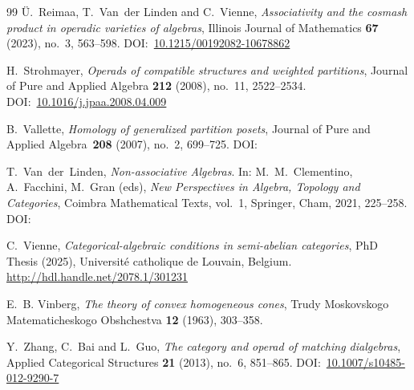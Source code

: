 \documentclass[reqno,a4paper]{amsart}
\renewcommand{\doi}[1]{DOI:~\href{https://doi.org/#1}{#1}}
\theoremstyle{plain}
\theoremstyle{definition}
\theoremstyle{remark}
\numberwithin{equation}{section}
\begin{document}
\begin{thebibliography}{99}
Ü.~Reimaa, T.~Van~der Linden and C.~Vienne, \emph{Associativity and the cosmash product in operadic varieties of algebras}, Illinois Journal of Mathematics \textbf{67} (2023), no.~3, 563--598. \doi{10.1215/00192082-10678862}

H.~Strohmayer, \emph{Operads of compatible structures and weighted partitions}, Journal of Pure and Applied Algebra \textbf{212} (2008), no.~11, 2522--2534. \doi{10.1016/j.jpaa.2008.04.009}

B.~Vallette, \emph{Homology of generalized partition posets}, Journal of Pure and Applied Algebra~\textbf{208} (2007), no.~2, 699--725.
\doi{}

T.~Van~der~Linden, \emph{Non-associative Algebras}. In: M.~M.~Clementino, A.~Facchini, M.~Gran (eds), \emph{New Perspectives in Algebra, Topology and Categories}, Coimbra Mathematical Texts, vol.~1, Springer, Cham, 2021, 225--258.
\doi{}

C.~Vienne, \emph{Categorical-algebraic conditions in semi-abelian categories}, PhD Thesis (2025), Université catholique de Louvain, Belgium. \url{http://hdl.handle.net/2078.1/301231}

E.~B. Vinberg, \emph{The theory of convex homogeneous cones}, Trudy Moskovskogo Matematicheskogo Obshchestva \textbf{12} (1963), 303--358.

Y.~Zhang, C.~Bai and L.~Guo, \emph{The category and operad of matching dialgebras}, Applied Categorical Structures \textbf{21} (2013), no.~6, 851--865. \doi{10.1007/s10485-012-9290-7}

\end{thebibliography}

\vspace{1.5\baselineskip}
\end{document}
